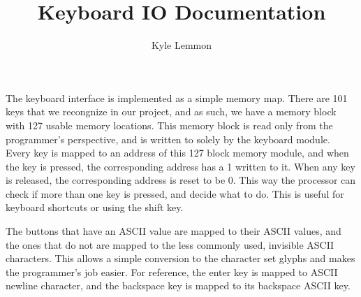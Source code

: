 \documentclass[../../ProjectDocumentation.tex]{subfiles}
\title{\textbf{Keyboard IO Documentation}}
\author{Kyle Lemmon}
\date{}
\begin{document}
\maketitle

The keyboard interface is implemented as a simple memory map. There are 101 keys that we recongnize in our project, and as such, we have a memory block with 127 usable memory locations. This memory block is read only from the programmer's perspective, and is written to solely by the keyboard module. Every key is mapped to an address of this 127 block memory module, and when the key is pressed, the corresponding address has a 1 written to it. When any key is released, the corresponding address is reset to be 0. This way the processor can check if more than one key is pressed, and decide what to do. This is useful for keyboard shortcuts or using the shift key.

The buttons that have an ASCII value are mapped to their ASCII values, and the ones that do not are mapped to the less commonly used, invisible ASCII characters. This allows a simple conversion to the character set glyphs and makes the programmer's job easier. For reference, the enter key is mapped to ASCII newline character, and the backspace key is mapped to its backspace ASCII key.
\end{document}
